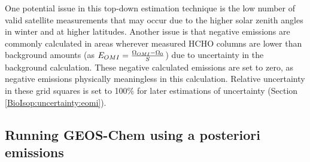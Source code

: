    
    
    One potential issue in this top-down estimation technique is the low number of valid satellite measurements that may occur due to the higher solar zenith angles in winter and at higher latitudes.
    Another issue is that negative emissions are commonly calculated in areas wherever measured HCHO columns are lower than background amounts (as $E_{OMI} = \frac{\Omega_{OMI} - \Omega_0}{S}$) due to uncertainty in the background calculation.
    These negative calculated emissions are set to zero, as negative emissions physically meaningless in this calculation.
    Relative uncertainty in these grid squares is set to 100\% for later estimations of uncertainty (Section \ref{BioIsop:uncertainty:eomi}).
    
  
    
  \subsection{Running GEOS-Chem using a posteriori emissions}
  \label{BioIsop:method:scaled}
    
